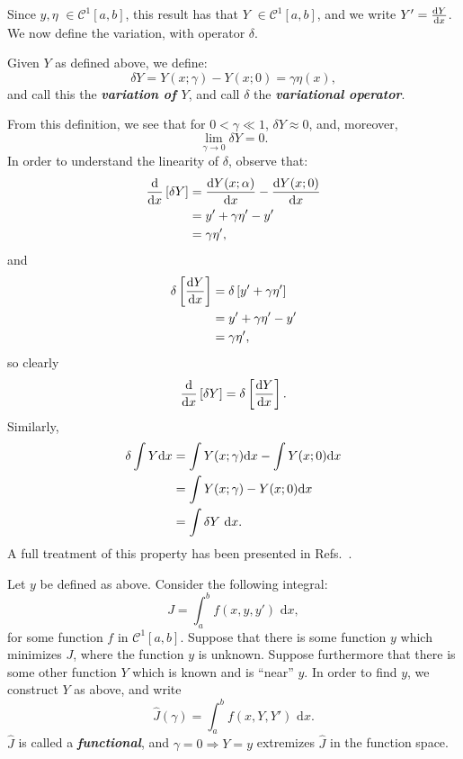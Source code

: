 Since $y,\eta$ $\in\mathcal C^1[a,b]$, this result has that $Y$ $\in\mathcal C^1[a,b]$, and we write $Y' = \frac{\text dY}{\text dx}$.\newline
We now define the variation, with operator $\delta$.
\begin{definition} 
Given $Y$ as defined above, we define:
\begin{equation}
\delta Y = Y(x;\gamma)-Y(x;0) = \gamma\eta(x),
\end{equation}
and call this the \emph{\textbf{variation of $Y$}}, and call $\delta$ the \emph{\textbf{variational operator}}.
\end{definition}
From this definition, we see that for $0<\gamma\ll 1$, $\delta Y \approx 0$, and, moreover, 
\begin{equation}
\lim_{\gamma\to 0}{\delta Y}=0.
\end{equation}
In order to understand the linearity of $\delta$, observe that:
\begin{align}
\frac{\text d}{\text dx}\left[\delta Y\right] &= \frac{\text dY(x;\alpha)}{\text dx}-\frac{\text dY(x;0)}{\text dx}\\
                                 &= y'+\gamma\eta' - y'\\
                                 &= \gamma\eta',
\end{align}
and
\begin{align}
\delta\left[\frac{\text dY}{\text dx}\right] &= \delta\left[y'+\gamma\eta'\right]\\
                                 &= y'+\gamma\eta' - y'\\
                                 &= \gamma\eta',
\end{align}
so clearly
\begin{equation}
\frac{\text d}{\text dx}\left[\delta Y\right] = \delta\left[\frac{\text dY}{\text dx}\right].
\end{equation}
Similarly,
\begin{align}
\delta\int{Y}\text dx &= \int{Y(x;\gamma)}\text dx-\int{Y(x;0)}\text dx\\
					  &= \int{Y(x;\gamma)-Y(x;0)}\text dx\\
					  &= \int{\delta Y}\text{ d}x.
\end{align}
A full treatment of this property has been presented in Refs.~\cite{cornelius1970variational,weinstock1974calculus}.
\begin{definition}
Let $y$ be defined as above. Consider the following integral:
\begin{equation}
J = \int_a^b{f(x,y,y')}\text{ d}x,
\end{equation}
for some function $f$ in $\mathcal C^1[a,b]$. Suppose that there is some function $y$ which minimizes $J$, where the function $y$ is unknown. Suppose furthermore that there is some other function $Y$ which is known and is ``near'' $y$. In order to find $y$, we construct $Y$ as above, and write
\begin{equation}
\hat J(\gamma) = \int_a^b{f(x,Y,Y')}\text{ d}x.
\end{equation}
$\hat J$ is called a \emph{\textbf{functional}}, and $\gamma=0\Rightarrow Y=y$ extremizes $\hat J$ in the function space. 
\end{definition}
